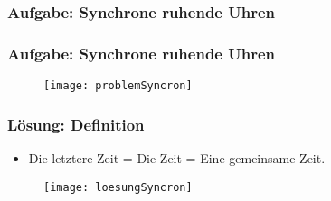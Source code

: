 \documentclass[]{beamer}%
\newcommand{\drawBasis}[5]{%
    \tikzmath{  \sLW=#2;}
    \draw[line width=1pt*\sLW,->] (0,0,0) -- (1,0,0) node[scale=#1, anchor=north east]{$#3$};
    \draw[line width=1pt*\sLW,->] (0,0,0) -- (0,1,0) node[scale=#1, anchor=south]{$#4$};
    \draw[line width=1pt*\sLW,->] (0,0,0) -- (0,0,1) node[scale=#1, anchor=south]{$#5$};
}
\newcommand{\clock}[6]{%
    \begin{scope}[xshift=#1, yshift=#2, scale=#3, line cap=round]
        \tikzmath{
            \sLW = #4;  %
        } 
        \draw [line width=1.6pt*\sLW] (0,0) circle (1.15cm);
        \foreach \angle in {0, 30, ..., 330} 
            \draw[line width=1pt*\sLW] (\angle:0.89cm) -- (\angle:1cm);
        \foreach \angle in {0,90,180,270}
            \draw[line width=1.4pt*\sLW] (\angle:0.82cm) -- (\angle:1cm);
        \draw[line width=1.6pt*\sLW] (0,0) -- (90-30*#5:0.4cm); %
        \draw[line width=1.3pt*\sLW] (0,0) -- (90-6*#6:0.65cm); %
    \end{scope}
}
\newcommand{\guy}[4]{%
    \begin{scope}[xshift=#1,yshift=#2,scale=#3]
        \tikzmath{
            \sLW = #4;  %
        } 
        \draw[line width=2pt*\sLW] (0,0) circle (1cm);               %
        \draw[fill=black] (35:0.3cm) circle (0.08cm*\sLW);           %
        \draw[fill=black] (145:0.3cm) circle (0.08cm*\sLW);          %
        \draw[line width=2pt*\sLW] ([shift={+(0cm,0cm)}]245:0.5cm) arc (245:295:0.5cm);
        
        \draw[line width=2pt*\sLW] (0,-1cm) -- ++(-90:2.25cm);       %
        \draw[line width=2pt*\sLW] (0,-2cm) -- ++(30:1.5cm);         %
        \draw[line width=2pt*\sLW] (0,-2cm) -- ++(150:1.5cm);        %
        \draw[line width=2pt*\sLW] (0,-3.25cm) -- ++(-60:1.5cm);     %
        \draw[line width=2pt*\sLW] (0,-3.25cm) -- ++(240:1.5cm);     %
    \end{scope}
}
\newcommand{\spaceTime}[9]{%
    \begin{scope}[xshift=#1, yshift=#2, scale=#3]
        \tdplotsetmaincoords{55}{30}
        \begin{scope}[scale=1, tdplot_main_coords]
            \drawBasis{#5}{#4}{#6}{#7}{#8}
            \begin{scope}[scale=2]
                \clock{0.43cm}{0.1cm}{0.15}{0.8*#4}{9}{5};
                \begin{scope}[xshift=0.7cm, yshift=0]    
                    \node[scale=#5](0,0){$#9$};
                \end{scope}
            \end{scope}
        \end{scope}
        \tdplotsetmaincoords{0}{0}
    \end{scope}
}
\begin{document}
\begin{frame}
    \frametitle{Aufgabe: Synchrone ruhende Uhren}
    \begin{figure}[h]
        \centering
    \end{figure}        
\end{frame}

\begin{frame}
    \frametitle{Aufgabe: Synchrone ruhende Uhren}
    \begin{figure}[h]
            \centering
            \texttt{[image: problemSyncron]}
            \caption{\cite{Einstein1905}}
    \end{figure}
\end{frame}

\begin{frame}
    \frametitle{Lösung: Definition}
    \begin{itemize}
        \item Die letztere Zeit = Die Zeit = Eine gemeinsame Zeit. 
    \end{itemize}
    \begin{figure}[h]
            \centering
            \texttt{[image: loesungSyncron]}
            \caption{\cite{Einstein1905}}
    \end{figure}
\end{frame}
\end{document}
